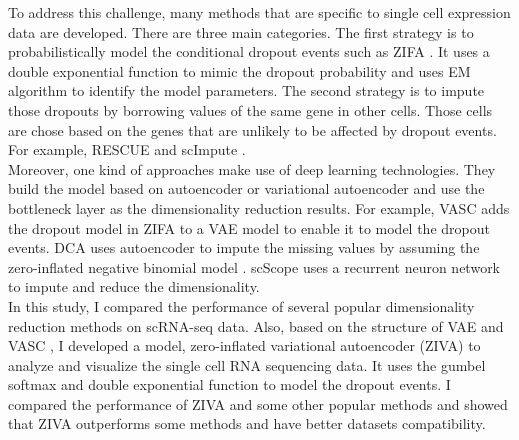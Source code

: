 To address this challenge, many methods that are specific to single cell expression data are developed. There are three main categories. The first strategy is to probabilistically model the conditional dropout events such as ZIFA \cite{Pierson2015}. It uses a double exponential function to mimic the dropout probability and uses EM algorithm \cite{mclachlan2007algorithm} to identify the model parameters.
The second strategy is to impute those dropouts by borrowing values of the same gene in other cells. Those cells are chose based on the genes that are unlikely to be affected by dropout events. For example, RESCUE \cite{Tracy2019} and scImpute \cite{Li2018}. \\
Moreover, one kind of approaches make use of deep learning technologies. They build the model based on autoencoder or variational autoencoder and use the bottleneck layer as the dimensionality reduction results. For example, VASC \cite{Wang2018} adds the dropout model in ZIFA to a VAE model to enable it to model the dropout events. DCA \cite{Eraslan2019a} uses autoencoder to impute the missing values by assuming the zero-inflated negative binomial model \cite{Hafemeister2019}. scScope \cite{Deng2019} uses a recurrent neuron network to impute and reduce the dimensionality. \\
In this study, I compared the performance of several popular dimensionality reduction methods on scRNA-seq data. Also, based on the structure of VAE \cite{Kingma2014} and VASC \cite{Wang2018}, I developed a model, zero-inflated variational autoencoder (ZIVA) to analyze and visualize the single cell RNA sequencing data. It uses the gumbel softmax and double exponential function to model the dropout events. I compared the performance of ZIVA and some other popular methods and showed that ZIVA outperforms some methods and have better datasets compatibility.

